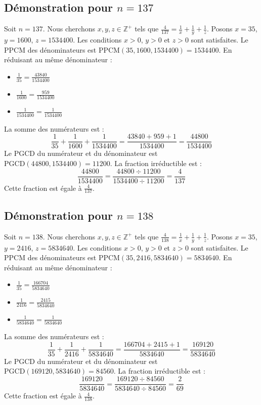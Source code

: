 \documentclass[11pt,a4paper]{article}
\begin{document}
\subsection{Démonstration pour $n = 137$}
Soit $n = 137$. Nous cherchons $x, y, z \in \mathbb{Z}^{+}$ tels que $\frac{4}{137} = \frac{1}{x} + \frac{1}{y} + \frac{1}{z}$.
Posons $x = 35$, $y = 1600$, $z = 1534400$.
Les conditions $x > 0$, $y > 0$ et $z > 0$ sont satisfaites.
Le PPCM des dénominateurs est $\text{PPCM}(35, 1600, 1534400) = 1534400$.
En réduisant au même dénominateur :
\begin{itemize}
    \item $\frac{1}{35} = \frac{43840}{1534400}$
    \item $\frac{1}{1600} = \frac{959}{1534400}$
    \item $\frac{1}{1534400} = \frac{1}{1534400}$
\end{itemize}
La somme des numérateurs est :
$$ \frac{1}{35} + \frac{1}{1600} + \frac{1}{1534400} = \frac{43840 + 959 + 1}{1534400} = \frac{44800}{1534400} $$
Le PGCD du numérateur et du dénominateur est $\text{PGCD}(44800, 1534400) = 11200$.
La fraction irréductible est :
$$ \frac{44800}{1534400} = \frac{44800 \div 11200}{1534400 \div 11200} = \frac{4}{137} $$
Cette fraction est égale à $\frac{4}{137}$.

\subsection{Démonstration pour $n = 138$}
Soit $n = 138$. Nous cherchons $x, y, z \in \mathbb{Z}^{+}$ tels que $\frac{4}{138} = \frac{1}{x} + \frac{1}{y} + \frac{1}{z}$.
Posons $x = 35$, $y = 2416$, $z = 5834640$.
Les conditions $x > 0$, $y > 0$ et $z > 0$ sont satisfaites.
Le PPCM des dénominateurs est $\text{PPCM}(35, 2416, 5834640) = 5834640$.
En réduisant au même dénominateur :
\begin{itemize}
    \item $\frac{1}{35} = \frac{166704}{5834640}$
    \item $\frac{1}{2416} = \frac{2415}{5834640}$
    \item $\frac{1}{5834640} = \frac{1}{5834640}$
\end{itemize}
La somme des numérateurs est :
$$ \frac{1}{35} + \frac{1}{2416} + \frac{1}{5834640} = \frac{166704 + 2415 + 1}{5834640} = \frac{169120}{5834640} $$
Le PGCD du numérateur et du dénominateur est $\text{PGCD}(169120, 5834640) = 84560$.
La fraction irréductible est :
$$ \frac{169120}{5834640} = \frac{169120 \div 84560}{5834640 \div 84560} = \frac{2}{69} $$
Cette fraction est égale à $\frac{4}{138}$.
\end{document}
